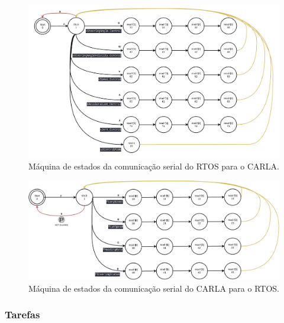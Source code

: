 \begin{figure}[H]
	\centering
	\includegraphics[width=1\linewidth]{img/sm_uc_2_carla}
	\caption{Máquina de estados da comunicação serial do RTOS para o CARLA.}
	\label{fig:smuccarla}
\end{figure}


\begin{figure}[H]
\centering
\includegraphics[width=1\linewidth]{img/sm_carla_2_uc}
\caption{Máquina de estados da comunicação serial do CARLA para o RTOS.}
\label{fig:sm_carla_uc}
\end{figure}



\subsubsection*{Tarefas}

